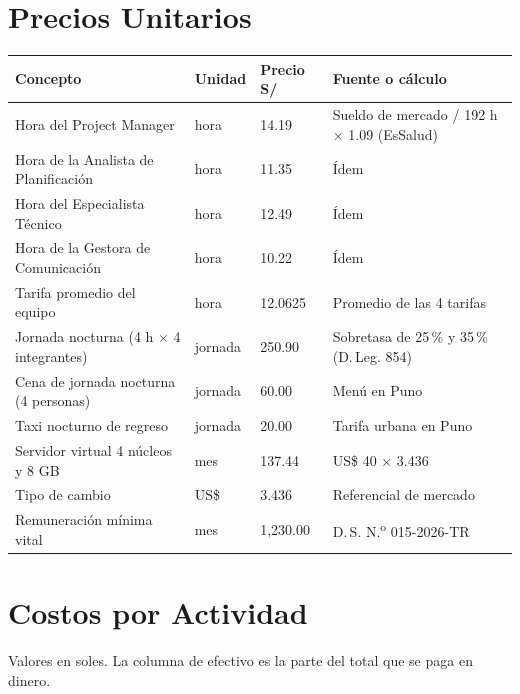 \documentclass[11pt,a4paper]{article}
\begin{document}
\section{Precios Unitarios}
{\small
{}
\noindent\begin{tabularx}{\textwidth}{@{}P{5.6cm} C{1.7cm} Q{1.6cm} L@{}}
\toprule
{}
\textbf{Concepto} & \textbf{Unidad} & \textbf{Precio S/} & \textbf{Fuente o cálculo} \\
\midrule
Hora del Project Manager & hora & 14.19 & Sueldo de mercado / 192 h $\times$ 1.09 (EsSalud) \\
Hora de la Analista de Planificación & hora & 11.35 & Ídem \\
Hora del Especialista Técnico & hora & 12.49 & Ídem \\
Hora de la Gestora de Comunicación & hora & 10.22 & Ídem \\
Tarifa promedio del equipo & hora & 12.0625 & Promedio de las 4 tarifas \\
Jornada nocturna (4 h $\times$ 4 integrantes) & jornada & 250.90 & Sobretasa de 25\,\% y 35\,\% (D.\,Leg. 854) \\
Cena de jornada nocturna (4 personas) & jornada & 60.00 & Menú en Puno \\
Taxi nocturno de regreso & jornada & 20.00 & Tarifa urbana en Puno \\
Servidor virtual 4 núcleos y 8 GB & mes & 137.44 & US\$ 40 $\times$ 3.436 \\
Tipo de cambio & US\$ & 3.436 & Referencial de mercado \\
Remuneración mínima vital & mes & 1,230.00 & D.\,S. N.\textsuperscript{o} 015-2026-TR \\
\bottomrule
\end{tabularx}
}

\section{Costos por Actividad}
Valores en soles. La columna de efectivo es la parte del total que se paga en dinero.
\end{document}
